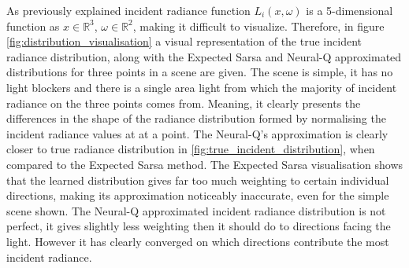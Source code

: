 \documentclass[../dissertation.tex]{subfiles}
\begin{document}
As previously explained incident radiance function $L_i(x, \omega)$ is a 5-dimensional function as $x \in \mathbb{R}^3$, $\omega \in \mathbb{R}^2$, making it difficult to visualize. Therefore, in figure \ref{fig:distribution_visualisation} a visual representation of the true incident radiance distribution, along with the Expected Sarsa and Neural-Q approximated distributions for three points in a scene are given. The scene is simple, it has no light blockers and there is a single area light from which the majority of incident radiance on the three points comes from. Meaning, it clearly presents the differences in the shape of the radiance distribution formed by normalising the incident radiance values at at a point. The Neural-Q's approximation is clearly closer to true radiance distribution in \ref{fig:true_incident_distribution}, when compared to the Expected Sarsa method. The Expected Sarsa visualisation shows that the learned distribution gives far too much weighting to certain individual directions, making its approximation noticeably inaccurate, even for the simple scene shown. The Neural-Q approximated incident radiance distribution is not perfect, it gives slightly less weighting then it should do to directions facing the light. However it has clearly converged on which directions contribute the most incident radiance.
\end{document}
